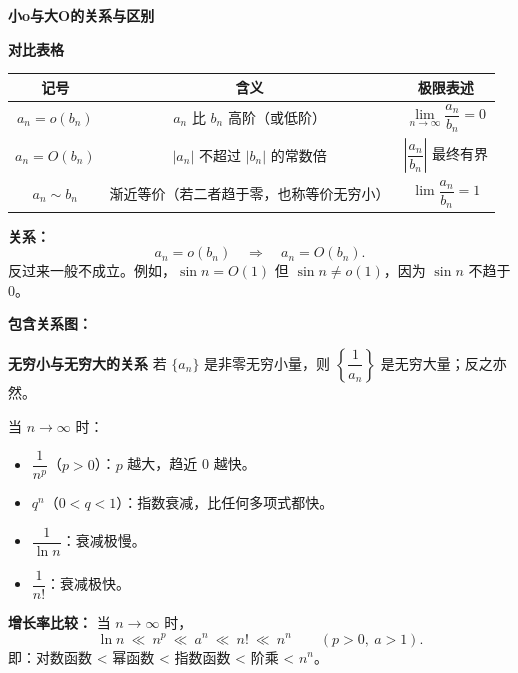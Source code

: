 \documentclass[fontset=fandol]{ctexart}
\newenvironment{custom}[1]{\par\noindent\textbf{#1}\quad}{\par\vspace{0.8em}}
\begin{document}
\textbf{小o与大O的关系与区别}

\begin{custom}{对比表格}
\begin{tabular}{|c|c|c|}
\hline
\textbf{记号} & \textbf{含义} & \textbf{极限表述} \\
\hline
\(a_n = o(b_n)\) & \(a_n\) 比 \(b_n\) 高阶（或低阶） & \(\lim\limits_{n \to \infty} \dfrac{a_n}{b_n} = 0\) \\
\hline
\(a_n = O(b_n)\) & \(|a_n|\) 不超过 \(|b_n|\) 的常数倍 & \(\left|\dfrac{a_n}{b_n}\right|\) 最终有界 \\
\hline
\(a_n \sim b_n\) & 渐近等价（若二者趋于零，也称等价无穷小） & \(\lim \dfrac{a_n}{b_n} = 1\) \\
\hline
\end{tabular}

\textbf{关系：}
\[
a_n=o(b_n)\quad\Longrightarrow\quad a_n=O(b_n).
\]
反过来一般不成立。例如，\(\sin n=O(1)\) 但 \(\sin n\neq o(1)\)，因为 \(\sin n\) 不趋于 \(0\)。

\textbf{包含关系图：}
\begin{center}
\end{center}
\end{custom}

\begin{custom}{无穷小与无穷大的关系}
若 \(\{a_n\}\) 是非零无穷小量，则 \(\left\{\dfrac{1}{a_n}\right\}\) 是无穷大量；反之亦然。
\end{custom}

\begin{example}[常见无穷小量的比较]
当 \(n \to \infty\) 时：
\begin{itemize}
\item \(\dfrac{1}{n^p}\)（\(p>0\)）：\(p\) 越大，趋近 0 越快。
\item \(q^n\)（\(0 < q < 1\)）：指数衰减，比任何多项式都快。
\item \(\dfrac{1}{\ln n}\)：衰减极慢。
\item \(\dfrac{1}{n!}\)：衰减极快。
\end{itemize}

\textbf{增长率比较：} 当 \(n \to \infty\) 时，
\[
\ln n \ \ll\ n^p \ \ll\ a^n \ \ll\ n! \ \ll\ n^n \qquad (p>0,\ a>1).
\]
即：对数函数 < 幂函数 < 指数函数 < 阶乘 < \(n^n\)。
\end{example}
\end{document}
